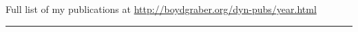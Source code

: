 \documentclass[11pt]{amsart}
\begin{document}


\clearpage




\begin{center}
Full list of my publications at \url{http://boydgraber.org/dyn-pubs/year.html}
\end{center}


\noindent\rule{4cm}{0.4pt}
\end{document}
